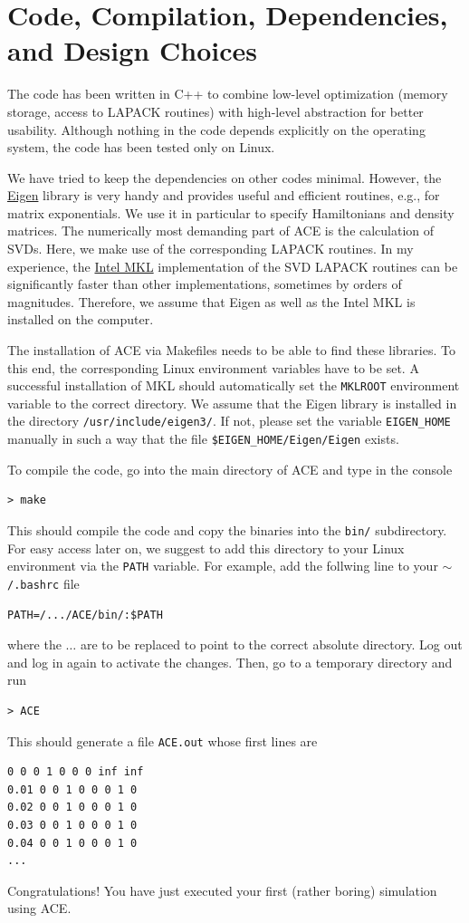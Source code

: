 \documentclass{scrartcl}
\begin{document}
\section{Code, Compilation, Dependencies, and Design Choices}
The code has been written in C++ to combine low-level optimization 
(memory storage, access to LAPACK routines) with high-level abstraction
for better usability. Although nothing in the code depends explicitly on the
operating system, the code has been tested only on Linux.

We have tried to keep the dependencies on other codes minimal.
However, the \href{http://eigen.tuxfamily.org}{Eigen} library is very handy
and provides useful and efficient routines, e.g., for matrix exponentials.
We use it in particular to specify Hamiltonians and density matrices.
The numerically most demanding part of ACE is the calculation of SVDs. 
Here, we make use of the corresponding LAPACK routines. In my experience, the 
\href{https://software.intel.com/content/www/us/en/develop/tools/math-kernel-library.html}{Intel MKL} 
implementation of the SVD LAPACK routines can be significantly faster than
other implementations, sometimes by orders of magnitudes.
Therefore, we assume that Eigen as well as the Intel MKL is installed on the
computer. 

The installation of ACE via Makefiles needs to be able to find 
these libraries. To this end, the corresponding Linux environment variables 
have to be set.
A successful installation of MKL should automatically set the 
\texttt{MKLROOT} environment variable to the correct directory.
We assume that the Eigen library is installed in the directory
\texttt{/usr/include/eigen3/}. If not, please set the variable 
\texttt{EIGEN\_HOME} manually in such a way that the file 
\texttt{\$EIGEN\_HOME/Eigen/Eigen} exists.

To compile the code, go into the main directory of ACE and type in the
console
\begin{verbatim}
> make 
\end{verbatim}
This should compile the code and copy the binaries into the \texttt{bin/}
subdirectory. For easy access later on, we suggest to add this directory
to your Linux environment via the \texttt{PATH} variable. For example, 
add the follwing line to your \texttt{$\sim$/.bashrc} file 
\begin{verbatim}
PATH=/.../ACE/bin/:$PATH 
\end{verbatim}
where the $\dots$ are to be replaced to point to the correct absolute directory.
Log out and log in again to activate the changes. Then, go to a temporary
directory and run
\begin{verbatim}
> ACE
\end{verbatim}
This should generate a file \texttt{ACE.out} whose first lines are
\begin{verbatim}
0 0 0 1 0 0 0 inf inf
0.01 0 0 1 0 0 0 1 0
0.02 0 0 1 0 0 0 1 0
0.03 0 0 1 0 0 0 1 0
0.04 0 0 1 0 0 0 1 0
...
\end{verbatim}
Congratulations! You have just executed your first (rather boring) simulation
using ACE.
\end{document}
